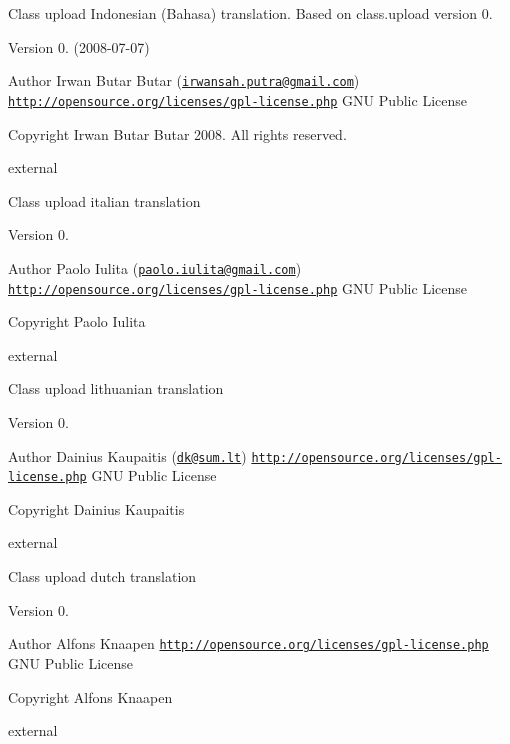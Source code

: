 Class upload Indonesian (Bahasa) translation. Based on class.\+upload version 0.

\begin{DoxyVersion}{Version}
0. (2008-\/07-\/07) 
\end{DoxyVersion}
\begin{DoxyAuthor}{Author}
Irwan Butar Butar (\href{mailto:irwansah.putra@gmail.com}{\tt irwansah.\+putra@gmail.\+com})  \href{http://opensource.org/licenses/gpl-license.php}{\tt http\+://opensource.\+org/licenses/gpl-\/license.\+php} G\+N\+U Public License 
\end{DoxyAuthor}
\begin{DoxyCopyright}{Copyright}
Irwan Butar Butar 2008. All rights reserved.
\end{DoxyCopyright}
external

Class upload italian translation

\begin{DoxyVersion}{Version}
0. 
\end{DoxyVersion}
\begin{DoxyAuthor}{Author}
Paolo Iulita (\href{mailto:paolo.iulita@gmail.com}{\tt paolo.\+iulita@gmail.\+com})  \href{http://opensource.org/licenses/gpl-license.php}{\tt http\+://opensource.\+org/licenses/gpl-\/license.\+php} G\+N\+U Public License 
\end{DoxyAuthor}
\begin{DoxyCopyright}{Copyright}
Paolo Iulita
\end{DoxyCopyright}
external

Class upload lithuanian translation

\begin{DoxyVersion}{Version}
0. 
\end{DoxyVersion}
\begin{DoxyAuthor}{Author}
Dainius Kaupaitis (\href{mailto:dk@sum.lt}{\tt dk@sum.\+lt})  \href{http://opensource.org/licenses/gpl-license.php}{\tt http\+://opensource.\+org/licenses/gpl-\/license.\+php} G\+N\+U Public License 
\end{DoxyAuthor}
\begin{DoxyCopyright}{Copyright}
Dainius Kaupaitis
\end{DoxyCopyright}
external

Class upload dutch translation

\begin{DoxyVersion}{Version}
0. 
\end{DoxyVersion}
\begin{DoxyAuthor}{Author}
Alfons Knaapen  \href{http://opensource.org/licenses/gpl-license.php}{\tt http\+://opensource.\+org/licenses/gpl-\/license.\+php} G\+N\+U Public License 
\end{DoxyAuthor}
\begin{DoxyCopyright}{Copyright}
Alfons Knaapen
\end{DoxyCopyright}
external

